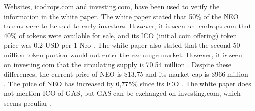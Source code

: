 \documentclass[12pt, a4paper]{article}
\begin{document}
Websites, icodrops.com and investing.com, have been used to verify the information in the white paper.  The white paper stated that 50\% of the NEO tokens were to be sold to early investors.  However, it is seen on icodrops.com that 40\% of tokens were available for sale, and its ICO (initial coin offering) token price was 0.2 USD per 1 Neo \cite{4}.  The white paper also stated that the second 50 million token portion would not enter the exchange market.  However, it is seen on investing.com that the circulating supply is 70.54 million \cite{5}.  Despite these differences, the current price of NEO is \$13.75 and its market cap is \$966 million \cite{5}.  The price of NEO has increased by 6,775\% since its ICO \cite{4}.  The white paper does not mention ICO of GAS, but GAS can be exchanged on investing.com, which seems peculiar \cite{6}.
\end{document}
